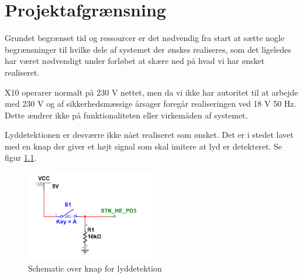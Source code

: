 \chapter{Projektafgrænsning}

Grundet begrænset tid og ressourcer er det nødvendig fra start at sætte nogle begrænsninger til hvilke dele af systemet der ønskes realiseres, som det ligeledes har været nødvendigt under forløbet at skære ned på hvad vi har ønsket realiseret. 

X10 operarer normalt på 230 V nettet, men da vi ikke har autoritet til at arbejde med 230 V og af sikkerhedsmæssige årsager foregår realiseringen ved 18 V 50 Hz. Dette ændrer ikke på funktionaliteten eller virkemåden af systemet. 

Lyddetektionen er desværre ikke nået realiseret som ønsket. Det er i stedet lavet med en knap der giver et højt signal som skal imitere at lyd er detekteret. Se figur \ref{fig:BABY_ALARM}. 

\begin{figure}[htbp]
  \centering
    \includegraphics[width=0.5\textwidth]{billeder/BABY_SWITCH}
    \caption{Schematic over knap for lyddetektion}
    \label{fig:BABY_ALARM}
\end{figure}

